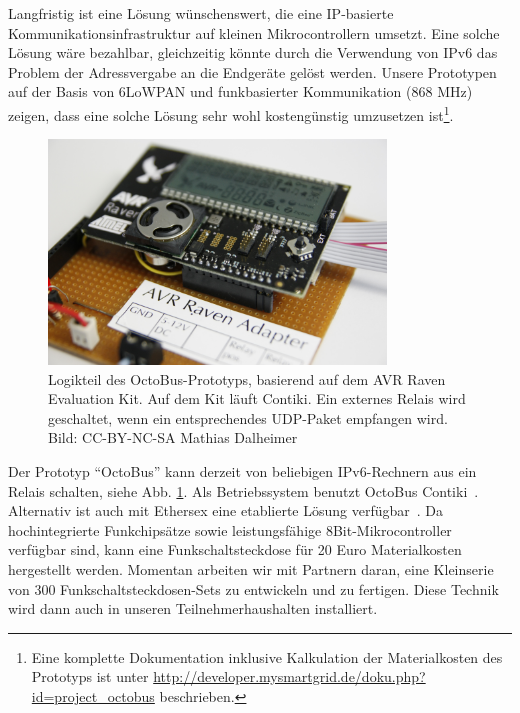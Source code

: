 \documentclass[logo]{fhgart}
\newcommand*\imgwidth{0.8\textwidth}
\begin{document}
Langfristig ist eine Lösung wünschenswert, die eine IP-basierte
Kommunikationsinfrastruktur auf kleinen Mikrocontrollern umsetzt. Eine
solche Lösung wäre bezahlbar, gleichzeitig könnte durch die Verwendung
von IPv6 das Problem der Adressvergabe an die Endgeräte gelöst werden.
Unsere Prototypen auf der Basis von 6LoWPAN und funkbasierter Kommunikation
(868 MHz) zeigen, dass eine solche Lösung sehr wohl
kostengünstig umzusetzen ist\footnote{Eine komplette Dokumentation
inklusive Kalkulation der Materialkosten des
Prototyps ist unter
\url{http://developer.mysmartgrid.de/doku.php?id=project_octobus}
beschrieben.}.
\begin{figure}[htbp]
  \begin{center}
    \includegraphics[width=\imgwidth]{figures/raven-adapter.JPG}
    \caption{Logikteil des OctoBus-Prototyps, basierend auf dem AVR
    Raven Evaluation Kit. Auf dem Kit läuft Contiki. Ein externes Relais
    wird geschaltet, wenn ein entsprechendes UDP-Paket empfangen wird.
    Bild: CC-BY-NC-SA Mathias Dalheimer}
    \label{fig:raven-adapter}
  \end{center}
\end{figure}
Der Prototyp "`OctoBus"' kann derzeit von beliebigen IPv6-Rechnern aus
ein Relais schalten, siehe Abb. \ref{fig:raven-adapter}.  Als
Betriebssystem benutzt OctoBus Contiki~\cite{yazar09efficient}.
Alternativ ist auch mit Ethersex eine etablierte Lösung
verfügbar~\cite{web:ethersex}. Da hochintegrierte Funkchipsätze sowie leistungsfähige
8Bit-Mikrocontroller verfügbar sind, kann eine
Funkschaltsteckdose für 20 Euro Materialkosten hergestellt werden.
Momentan arbeiten wir mit Partnern daran, eine Kleinserie von 300
Funkschaltsteckdosen-Sets zu entwickeln und zu fertigen. Diese Technik
wird dann auch in unseren Teilnehmerhaushalten installiert.
\end{document}
